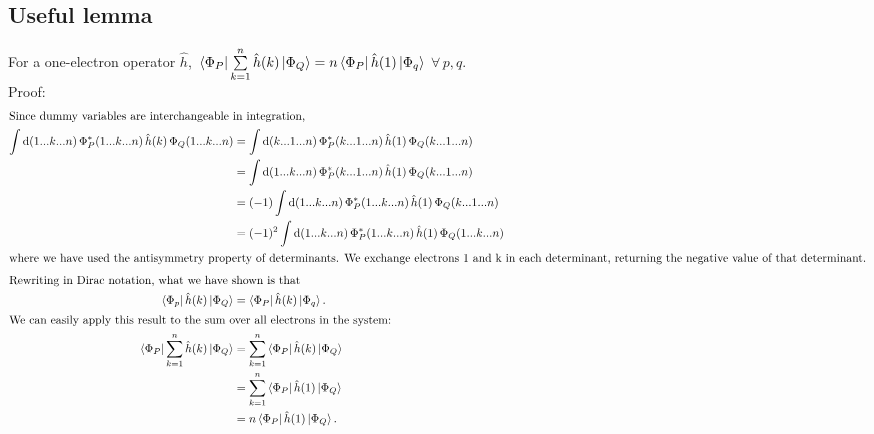\documentclass{article}
\newcommand{\suml}{\sum\limits}
\begin{document}
\subsection{Useful lemma}
For a one-electron operator $\hat{h}$, \,$\Bra{\Phi_P} \suml_{k=1}^{n} \hat{h}(k) \Ket{\Phi_Q} = n \Bra{\Phi_P} \hat{h}(1) \Ket{\Phi_q}$ $\forall \, p,q$.  \\
Proof: \vspace{-0.2cm}
\begin{align*}
\intertext{Since dummy variables are interchangeable in integration,}
\int \mathrm{d}(1 ... k ... n) \,  \Phi_P^* (1 ... k ... n) \, \hat{h} (k) \, \Phi_Q (1 ... k ... n) &= \int \mathrm{d}(k ... 1 ... n) \, \Phi_P^* (k ... 1 ... n) \, \hat{h} (1) \, \Phi_Q (k ... 1 ... n) \\
       &= \int \mathrm{d}(1 ... k ... n) \, \Phi_P^* (k ... 1 ... n) \, \hat{h} (1) \, \Phi_Q (k ... 1 ... n) \\
       &= (-1) \int \mathrm{d}(1 ... k ... n)\,  \Phi_P^* (1 ... k ... n) \, \hat{h} (1)\, \Phi_Q (k ... 1 ... n) \\
       &= (-1)^2 \int \mathrm{d}(1 ... k ... n) \, \Phi_P^* (1 ... k ... n) \, \hat{h} (1) \, \Phi_Q (1 ... k ... n) \\
\intertext{where we have used the antisymmetry property of determinants. We exchange electrons 1 and k in each determinant, returning the negative value of that determinant.}
\intertext{Rewriting in Dirac notation, what we have shown is that} 
\Bra{\Phi_p} \hat{h} (k) \Ket{\Phi_Q}  &= \Bra{\Phi_P}  \hat{h} (k) \Ket{\Phi_q}.  \\
\intertext{We can easily apply this result to the sum over all electrons in the system:}
\Bra{\Phi_P} \suml_{k=1}^n \hat{h} (k) \Ket{\Phi_Q}  &= \suml_{k=1}^n \Bra{\Phi_P}  \hat{h} (k) \Ket{\Phi_Q}  \\
									      &= \suml_{k=1}^n \Bra{\Phi_P}  \hat{h} (1) \Ket{\Phi_Q} \\
									       &= n \Bra{\Phi_P}  \hat{h} (1) \Ket{\Phi_Q}.
\end{align*}
\end{document}
